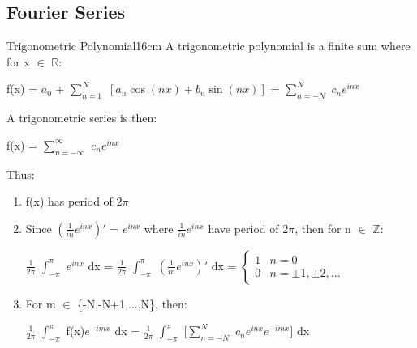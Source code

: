    \newpage





\subsection{ Fourier Series }

    \begin{definition}{Trigonometric Polynomial}{16cm}
        A {\color{lblue} trigonometric polynomial} is a finite sum where for
        x $\in$ $\mathbb{R}$:
        
        \hspace{0.5cm}
        f(x) = $a_0$ + $\sum_{n=1}^N$ $[a_n \cos(nx) + b_n \sin(nx)]$
        = $\sum_{n=-N}^N$ $c_n e^{inx}$

        A {\color{lblue} trigonometric series} is then:

        \hspace{0.5cm}
        f(x) = $\sum_{n=-\infty}^{\infty}$ $c_n e^{inx}$

        Thus:

        \begin{enumerate}[label=(\alph*), leftmargin=1.5cm, itemsep=0.1cm]
            \item f(x) has period of $2\pi$
            
            \item Since $(\frac{1}{in}e^{inx})'$ = $e^{inx}$ where
                $\frac{1}{in}e^{inx}$ have period of $2\pi$, then
                for n $\in$ $\mathbb{Z}$:

                \hspace{0.5cm}
                $\frac{1}{2\pi}$ $\int_{-\pi}^{\pi}$ $e^{inx}$ dx
                = $\frac{1}{2\pi}$ $\int_{-\pi}^{\pi}$ $(\frac{1}{in}e^{inx})'$ dx
                = $\begin{cases}
                    1 & n = 0 \\
                    0 & n = \pm 1, \pm 2, ...
                    \end{cases}$

            \item For m $\in$ \{-N,-N+1,...,N\}, then:
            
                \hspace{0.5cm}
                $\frac{1}{2\pi}$ $\int_{-\pi}^{\pi}$ f(x)$e^{-imx}$ dx
                = $\frac{1}{2\pi}$ $\int_{-\pi}^{\pi}$
                    [$\sum_{n=-N}^N$ $c_n e^{inx}e^{-imx}$] dx
                

\end{enumerate}
\end{definition}
